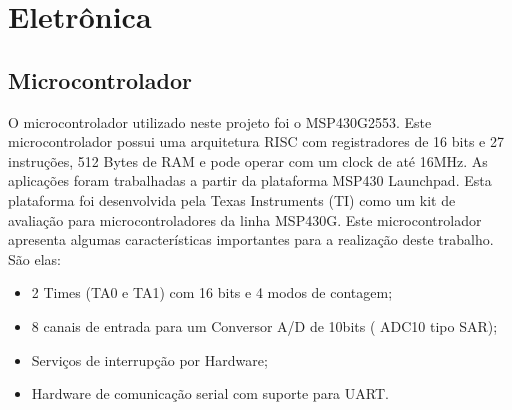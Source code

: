 \chapter{Eletrônica}
\label{eletronica}

\section{Microcontrolador} %
\label{sec:msp430}

O microcontrolador utilizado neste projeto foi o MSP430G2553. Este microcontrolador possui uma arquitetura RISC com registradores de 16 bits e 27 instruções, 512 Bytes de RAM e pode operar com um clock de até 16MHz. As aplicações foram trabalhadas a partir da plataforma MSP430 Launchpad. Esta plataforma foi desenvolvida pela Texas Instruments (TI) como um kit de avaliação para microcontroladores da linha MSP430G. Este microcontrolador apresenta algumas características importantes para a realização deste trabalho. São elas:
\begin {itemize}
	\item 2 Times (TA0 e TA1) com 16 bits e 4 modos de contagem;
	\item 8 canais de entrada para um Conversor A/D de 10bits ( ADC10 tipo SAR);
	\item Serviços de interrupção por Hardware;
	\item Hardware de comunicação serial com suporte para UART.
\end {itemize}

